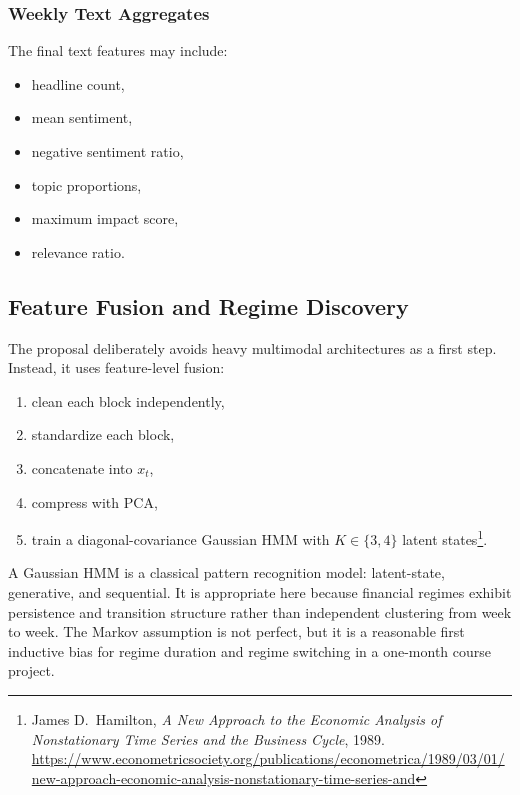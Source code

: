 \documentclass[11pt,a4paper]{article}
\newcommand{\fncite}[2]{\footnote{#1. \url{#2}}}
\begin{document}
\subsubsection{Weekly Text Aggregates}

The final text features may include:

\begin{itemize}[leftmargin=1.4em]
  \item headline count,
  \item mean sentiment,
  \item negative sentiment ratio,
  \item topic proportions,
  \item maximum impact score,
  \item relevance ratio.
\end{itemize}

\subsection{Feature Fusion and Regime Discovery}

The proposal deliberately avoids heavy multimodal architectures as a first step.
Instead, it uses feature-level fusion:

\begin{enumerate}[leftmargin=1.5em]
  \item clean each block independently,
  \item standardize each block,
  \item concatenate into $x_t$,
  \item compress with PCA,
  \item train a diagonal-covariance Gaussian HMM with $K \in \{3,4\}$ latent states\fncite{James D.~Hamilton, \emph{A New Approach to the Economic Analysis of Nonstationary Time Series and the Business Cycle}, 1989}{https://www.econometricsociety.org/publications/econometrica/1989/03/01/new-approach-economic-analysis-nonstationary-time-series-and}.
\end{enumerate}

\begin{insightbox}[title=\textbf{Why HMM Is the Right First Regime Model}]
A Gaussian HMM is a classical pattern recognition model: latent-state, generative, and sequential.
It is appropriate here because financial regimes exhibit persistence and transition structure rather than independent clustering from week to week.
The Markov assumption is not perfect, but it is a reasonable first inductive bias for regime duration and regime switching in a one-month course project.
\end{insightbox}
\end{document}
